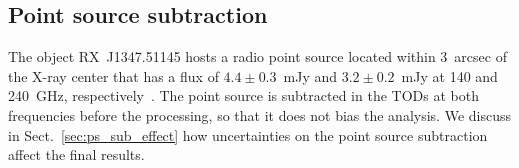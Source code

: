 \subsection{Point source subtraction}
\label{sec:point_source}
The object RX~J1347.51145 hosts a radio point source located within 3~arcsec of the X-ray center that has a flux of $4.4 \pm 0.3$~mJy and $3.2 \pm 0.2$~mJy  at 140 and 240~GHz, respectively~\citep{pointecouteau_2001}. The point source is subtracted in the TODs at both frequencies before the processing, so that it does not bias the analysis. We discuss in Sect.~\ref{sec:ps_sub_effect} how uncertainties on the point source subtraction affect the final results.

